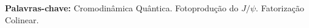 \documentclass[11pt]{article}
\begin{document}
\vspace{10pt}
\begin{center}
	\parbox{.9\textwidth}{\noindent\textbf{\small Palavras-chave:} \small Cromodinâmica Quântica. Fotoprodução do $J/\psi$. Fatorização Colinear.}
\end{center}
\vspace{20pt}



\end{document}
